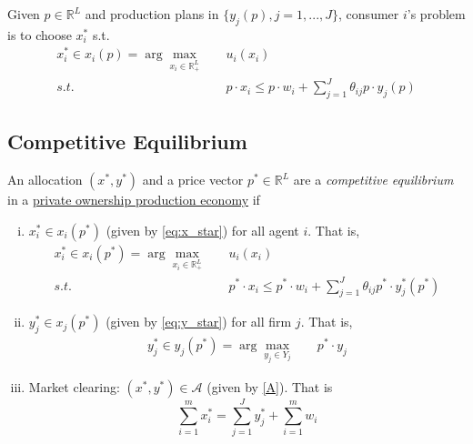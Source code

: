 \documentclass[11pt]{elegantbook}
\begin{document}
Given $p\in \mathbb{R}^L$ and production plans in $\{y_j(p),j=1,...,J\}$, consumer $i$'s problem is to choose $x_i^*$ s.t.
\begin{equation}
    \begin{aligned}
        x_i^*\in x_i(p)=\arg\max_{x_i\in \mathbb{R}^L_+}\quad& u_i(x_i)\\
        s.t.\quad& p\cdot x_i\leq p\cdot w_i+\sum_{j=1}^J\theta_{ij}p\cdot y_j(p)
    \end{aligned}
    \tag{xstar}
    \label{eq:x_star}
\end{equation}

\subsection{Competitive Equilibrium}
\begin{definition}
    \normalfont
    An allocation $(x^*,y^*)$ and a price vector $p^*\in \mathbb{R}^L$ are a \textit{competitive equilibrium} in a \underline{private ownership production economy} if
    \begin{enumerate}[(i).]
        \item $x_i^*\in x_i(p^*)$ (given by \eqref{eq:x_star}) for all agent $i$. That is,
        \begin{equation}
            \begin{aligned}
                x_i^*\in x_i(p^*)=\arg\max_{x_i\in \mathbb{R}^L_+}\quad& u_i(x_i)\\
        s.t.\quad& p^*\cdot x_i\leq p^*\cdot w_i+\sum_{j=1}^J\theta_{ij}p^*\cdot y^*_j(p^*)
            \end{aligned}
            \nonumber
        \end{equation}
        \item $y_j^*\in x_j(p^*)$ (given by \eqref{eq:y_star}) for all firm $j$. That is,
        \begin{equation}
            \begin{aligned}
                y_j^*\in y_j(p^*)=\arg\max_{y_j\in Y_j}\quad &p^*\cdot y_j
            \end{aligned}
            \nonumber
        \end{equation}
        \item Market clearing: $(x^*,y^*)\in \mathcal{A}$ (given by \eqref{A}). That is $$\sum_{i=1}^m x_i^*=\sum_{j=1}^J y_j^*+\sum_{i=1}^m w_i$$
    \end{enumerate}
\end{definition}
\end{document}

